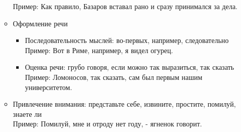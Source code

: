 \documentclass{article}
\begin{document}
\begin{enumerate}
\begin{itemize}
    Пример: Как правило, Базаров вставал рано и сразу принимался за дела.
  \item
    Оформление речи
    \begin{itemize}
    \item
      Последовательность мыслей: во-первых, например, следовательно\\
      Пример: Вот в Риме, например, я видел огурец.
    \item
      Оценка речи: грубо говоря, если можно так выразиться, так сказать\\
      Пример: Ломоносов, так сказать, сам был первым нашим университетом.
    \end{itemize}
  \item
    Привлечение внимания: представьте себе, извините, простите, помилуй, знаете ли\\
    Пример: Помилуй, мне и отроду нет году, - ягненок говорит.
  \end{itemize}

\end{enumerate}
\end{document}
